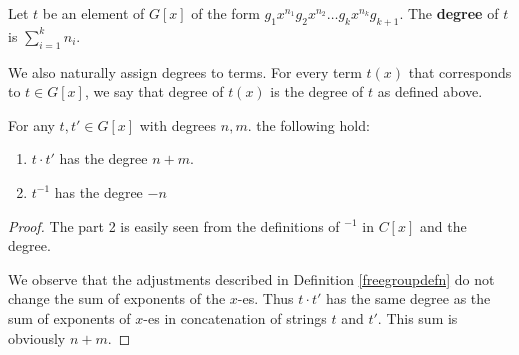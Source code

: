\begin{defn}
	Let $t$ be an element of $G[x]$ of the form $g_1 x^{n_1}g_2 x^{n_2}\dots g_k x^{n_k}g_{k+1}$. The \textbf{degree} of $t$ is $\sum_{i=1}^k n_i$.
	
\end{defn} 

We also naturally assign degrees to terms. For every term $t(x)$ that corresponds to $t\in G[x]$, we say that degree of $t(x)$ is the degree of $t$ as defined above.

\begin{lemma}
\label{degreelemma}
	For any $t,t'\in G[x]$ with degrees $n,m$. the following hold:
	\begin{enumerate}
		\item $t\cdot t'$ has the degree $n+m$.
		\item $t^{-1}$ has the degree $-n$
	\end{enumerate}
\end{lemma}
\begin{proof}
	The part 2 is easily seen from the definitions of $^{-1}$ in $C[x]$ and the degree.
	
We observe that the adjustments described in Definition \autoref{freegroupdefn} do not change the sum of exponents of the $x$-es. Thus $t\cdot t'$ has the same degree as the sum of exponents of $x$-es in concatenation of strings $t$ and $t'$. This sum is obviously $n+m$.
\end{proof}

